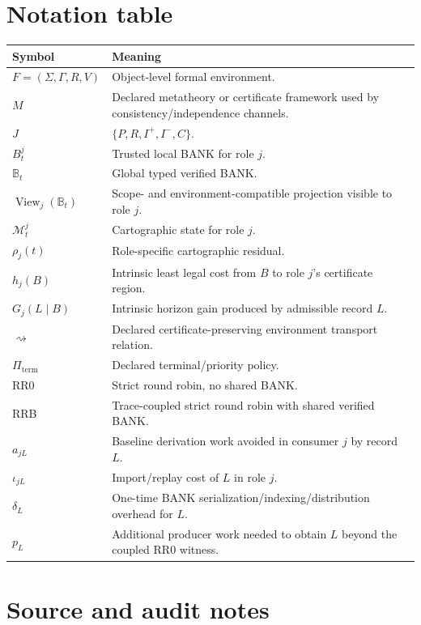 \documentclass[11pt]{article}
\newcommand{\BANK}{\mathbb{B}}
\newcommand{\View}{\operatorname{View}}
\begin{document}
\appendix
\section{Notation table}

\begin{longtable}{@{}p{}p{}@{}}
\toprule
Symbol & Meaning \\
\midrule
$F=(\Sigma,\Gamma,R,V)$ & Object-level formal environment. \\
$M$ & Declared metatheory or certificate framework used by consistency/independence channels. \\
$J$ & $\{P,R,I^+,I^-,C\}$. \\
$B_t^j$ & Trusted local BANK for role $j$. \\
$\BANK_t$ & Global typed verified BANK. \\
$\View_j(\BANK_t)$ & Scope- and environment-compatible projection visible to role $j$. \\
$\mathcal M_t^j$ & Cartographic state for role $j$. \\
$\rho_j(t)$ & Role-specific cartographic residual. \\
$h_j(B)$ & Intrinsic least legal cost from $B$ to role $j$'s certificate region. \\
$G_j(L\mid B)$ & Intrinsic horizon gain produced by admissible record $L$. \\
$\rightsquigarrow$ & Declared certificate-preserving environment transport relation. \\
$\Pi_{\mathrm{term}}$ & Declared terminal/priority policy. \\
RR0 & Strict round robin, no shared BANK. \\
RRB & Trace-coupled strict round robin with shared verified BANK. \\
$a_{jL}$ & Baseline derivation work avoided in consumer $j$ by record $L$. \\
$\iota_{jL}$ & Import/replay cost of $L$ in role $j$. \\
$\delta_L$ & One-time BANK serialization/indexing/distribution overhead for $L$. \\
$p_L$ & Additional producer work needed to obtain $L$ beyond the coupled RR0 witness. \\
\bottomrule
\end{longtable}

\section{Source and audit notes}
\end{document}
